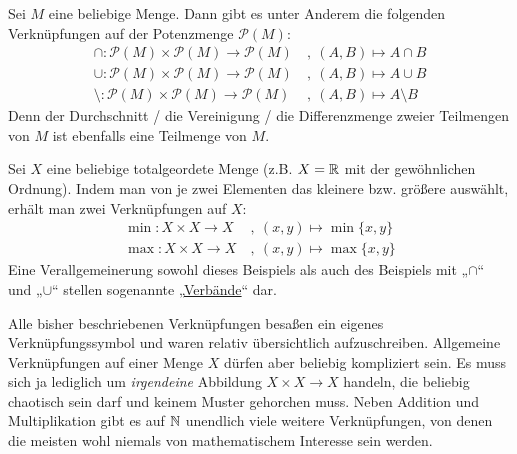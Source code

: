 \begin{bsp}
 Sei $M$ eine beliebige Menge. Dann gibt es unter Anderem die folgenden Verknüpfungen auf der Potenzmenge $\mathcal{P}(M)$:
 \begin{align*}
  \cap : \mathcal{P}(M)\times \mathcal{P}(M) \to \mathcal{P}(M) \ & ,\ (A,B)\mapsto A\cap B \\
    \cup : \mathcal{P}(M)\times \mathcal{P}(M) \to \mathcal{P}(M) \ &,\ (A,B)\mapsto A\cup B \\
\setminus : \mathcal{P}(M)\times \mathcal{P}(M) \to \mathcal{P}(M) \ &,\ (A,B)\mapsto A\setminus B
 \end{align*}
 Denn der Durchschnitt / die Vereinigung / die Differenzmenge zweier Teilmengen von $M$ ist ebenfalls eine Teilmenge von $M$.
\end{bsp}





\begin{bsp} \label{minmax}
 Sei $X$ eine beliebige totalgeordete Menge (z.B. $X={\mathbb R}$ mit der gewöhnlichen Ordnung). Indem man von je zwei Elementen das kleinere bzw. größere auswählt, erhält man zwei Verknüpfungen auf $X$:
 \begin{align*}
  \min : X\times X\to X\ &,\ (x,y)\mapsto \min\{x,y\} \\
  \max : X\times X\to X\ &,\ (x,y)\mapsto \max\{x,y\}
 \end{align*}
Eine Verallgemeinerung sowohl dieses Beispiels als auch des Beispiels mit „$\cap$“ und „$\cup$“ stellen sogenannte „\href{https://de.wikipedia.org/wiki/Verband_(Mathematik)}{Verbände}“ dar.
\end{bsp}




\begin{bem}
Alle bisher beschriebenen Verknüpfungen besaßen ein eigenes Verknüpfungssymbol und waren relativ übersichtlich aufzuschreiben. Allgemeine Verknüpfungen auf einer Menge $X$ dürfen aber beliebig kompliziert sein. Es muss sich ja lediglich um \emph{irgendeine} Abbildung $X\times X\to X$ handeln, die beliebig chaotisch sein darf und keinem Muster gehorchen muss. Neben Addition und Multiplikation gibt es auf ${\mathbb N}$ unendlich viele weitere Verknüpfungen, von denen die meisten wohl niemals von mathematischem Interesse sein werden.
\end{bem}





